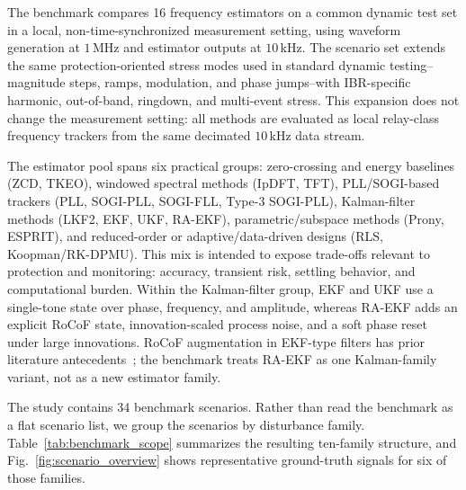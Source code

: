 \documentclass[conference,letterpaper]{IEEEtran}
\begin{document}
The benchmark compares 16 frequency estimators on a common dynamic test set in
a local, non-time-synchronized measurement setting, using waveform generation
at $1$\,MHz and estimator outputs at $10$\,kHz. The scenario set extends the
same protection-oriented stress modes used in standard dynamic
testing--magnitude steps, ramps, modulation, and phase jumps--with
IBR-specific harmonic, out-of-band, ringdown, and multi-event stress. This
expansion does not change the measurement setting: all methods are evaluated as
local relay-class frequency trackers from the same decimated $10$\,kHz data
stream.

The estimator pool spans six practical groups: zero-crossing and energy
baselines (ZCD, TKEO), windowed spectral methods (IpDFT, TFT), PLL/SOGI-based
trackers (PLL, SOGI-PLL, SOGI-FLL, Type-3 SOGI-PLL), Kalman-filter methods
(LKF2, EKF, UKF, RA-EKF), parametric/subspace methods (Prony, ESPRIT), and
reduced-order or adaptive/data-driven designs (RLS, Koopman/RK-DPMU). This mix
is intended to expose trade-offs relevant to protection and monitoring:
accuracy, transient risk, settling behavior, and computational burden. Within
the Kalman-filter group, EKF and UKF use a single-tone state over phase,
frequency, and amplitude, whereas RA-EKF adds an explicit RoCoF state,
innovation-scaled process noise, and a soft phase reset under large
innovations. RoCoF augmentation in EKF-type filters has prior literature
antecedents~\cite{Ferrero2020EKF,Chamorro2021}; the benchmark treats RA-EKF as
one Kalman-family variant, not as a new estimator family.

The study contains 34 benchmark scenarios. Rather than read the benchmark as a
flat scenario list, we group the scenarios by disturbance family.
Table~\ref{tab:benchmark_scope} summarizes the resulting ten-family structure,
and Fig.~\ref{fig:scenario_overview} shows representative ground-truth signals
for six of those families.
\end{document}
